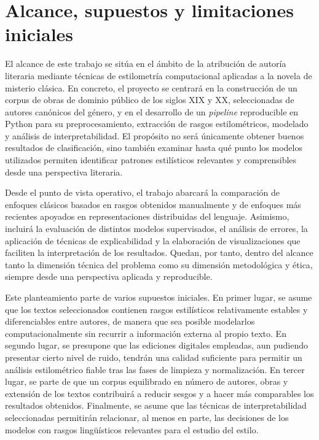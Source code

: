 \documentclass[IB]{TFUOC}%
\begin{document}
\section{Alcance, supuestos y limitaciones iniciales}

El alcance de este trabajo se sitúa en el ámbito de la atribución de autoría literaria mediante técnicas de estilometría computacional aplicadas a la novela de misterio clásica. En concreto, el proyecto se centrará en la construcción de un corpus de obras de dominio público de los siglos XIX y XX, seleccionadas de autores canónicos del género, y en el desarrollo de un \textit{pipeline} reproducible en Python para su preprocesamiento, extracción de rasgos estilométricos, modelado y análisis de interpretabilidad. El propósito no será únicamente obtener buenos resultados de clasificación, sino también examinar hasta qué punto los modelos utilizados permiten identificar patrones estilísticos relevantes y comprensibles desde una perspectiva literaria.

Desde el punto de vista operativo, el trabajo abarcará la comparación de enfoques clásicos basados en rasgos obtenidos manualmente y de enfoques más recientes apoyados en representaciones distribuidas del lenguaje. Asimismo, incluirá la evaluación de distintos modelos supervisados, el análisis de errores, la aplicación de técnicas de explicabilidad y la elaboración de visualizaciones que faciliten la interpretación de los resultados. Quedan, por tanto, dentro del alcance tanto la dimensión técnica del problema como su dimensión metodológica y ética, siempre desde una perspectiva aplicada y reproducible.

Este planteamiento parte de varios supuestos iniciales. En primer lugar, se asume que los textos seleccionados contienen rasgos estilísticos relativamente estables y diferenciables entre autores, de manera que sea posible modelarlos computacionalmente sin recurrir a información externa al propio texto. En segundo lugar, se presupone que las ediciones digitales empleadas, aun pudiendo presentar cierto nivel de ruido, tendrán una calidad suficiente para permitir un análisis estilométrico fiable tras las fases de limpieza y normalización. En tercer lugar, se parte de que un corpus equilibrado en número de autores, obras y extensión de los textos contribuirá a reducir sesgos y a hacer más comparables los resultados obtenidos. Finalmente, se asume que las técnicas de interpretabilidad seleccionadas permitirán relacionar, al menos en parte, las decisiones de los modelos con rasgos lingüísticos relevantes para el estudio del estilo.
\end{document}
